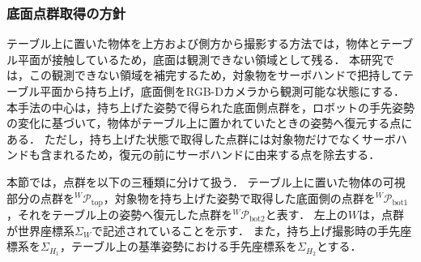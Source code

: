 






















\subsubsection{底面点群取得の方針}
\label{sec:system:bottom_acquisition_policy}

テーブル上に置いた物体を上方および側方から撮影する方法では，物体とテーブル平面が接触しているため，底面は観測できない領域として残る．
本研究では，この観測できない領域を補完するため，対象物をサーボハンドで把持してテーブル平面から持ち上げ，底面側をRGB-Dカメラから観測可能な状態にする．
本手法の中心は，持ち上げた姿勢で得られた底面側点群を，ロボットの手先姿勢の変化に基づいて，物体がテーブル上に置かれていたときの姿勢へ復元する点にある．
ただし，持ち上げた状態で取得した点群には対象物だけでなくサーボハンドも含まれるため，復元の前にサーボハンドに由来する点を除去する．

本節では，点群を以下の三種類に分けて扱う．
テーブル上に置いた物体の可視部分の点群を${}^{W}\mathcal{P}_{\mathrm{top}}$，対象物を持ち上げた姿勢で取得した底面側の点群を${}^{W}\mathcal{P}_{\mathrm{bot1}}$，それをテーブル上の姿勢へ復元した点群を${}^{W}\mathcal{P}_{\mathrm{bot2}}$と表す．
左上の$W$は，点群が世界座標系$\Sigma_W$で記述されていることを示す．
また，持ち上げ撮影時の手先座標系を$\Sigma_{H_1}$，テーブル上の基準姿勢における手先座標系を$\Sigma_{H_2}$とする．

